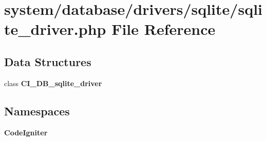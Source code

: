 \section{system/database/drivers/sqlite/sqlite\-\_\-driver.php File Reference}
\label{sqlite__driver_8php}
\subsection*{Data Structures}
\begin{DoxyCompactItemize}
\item 
class {\bf C\-I\-\_\-\-D\-B\-\_\-sqlite\-\_\-driver}
\end{DoxyCompactItemize}
\subsection*{Namespaces}
\begin{DoxyCompactItemize}
\item 
{\bf Code\-Igniter}
\end{DoxyCompactItemize}
